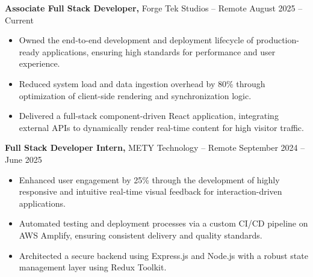\documentclass[11pt]{article}       %
\begin{document}
\textbf{Associate Full Stack Developer,} {Forge Tek Studios} -- Remote \hfill August 2025 -- Current 
\vspace{-9pt}
\begin{itemize}
  \item Owned the end-to-end development and deployment lifecycle of production-ready applications, ensuring high standards for performance and user experience.
  \item Reduced system load and data ingestion overhead by 80\% through optimization of client-side rendering and synchronization logic.
  \item Delivered a full-stack component-driven React application, integrating external APIs to dynamically render real-time content for high visitor traffic.
\end{itemize}

\textbf{Full Stack Developer Intern,} {METY Technology} -- Remote \hfill September 2024 -- June 2025 
\vspace{-9pt}
\begin{itemize}
  \item Enhanced user engagement by 25\% through the development of highly responsive and intuitive real-time visual feedback for interaction-driven applications.
  \item Automated testing and deployment processes via a custom CI/CD pipeline on AWS Amplify, ensuring consistent delivery and quality standards.
  \item Architected a secure backend using Express.js and Node.js with a robust state management layer using Redux Toolkit.
\end{itemize}

\vspace{-18.5pt}
\end{document}
